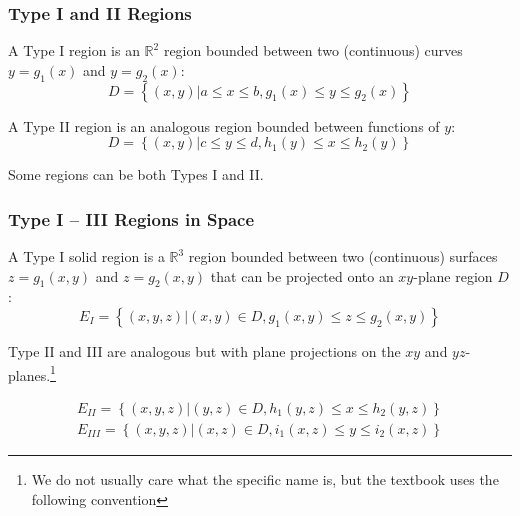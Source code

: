 \documentclass{article}
\begin{document}
\subsubsection{Type I and II Regions}
A Type I region is an $\mathbb{R}^2$ region bounded between two (continuous) curves $y=g_1(x)$ and $y=g_2(x)$:
$$D=\left\{(x,y)|a\le x\le b, g_1(x)\le y\le g_2(x)\right\}$$

A Type II region is an analogous region bounded between functions of $y$:
$$D=\left\{(x,y)|c\le y\le d, h_1(y)\le x\le h_2(y)\right\}$$

Some regions can be both Types I and II.

\subsubsection{Type I -- III Regions in Space}
A Type I solid region is a $\mathbb{R}^3$ region bounded between two (continuous) surfaces $z=g_1(x,y)$ and $z=g_2(x,y)$ that can be projected onto an $xy$-plane region $D$:
$$E_I=\left\{(x,y,z)|(x,y)\in D, g_1(x,y)\le z \le g_2(x,y)\right\}$$

Type II and III are analogous but with plane projections on the $xy$ and $yz$-planes.\footnote{We do not usually care what the specific name is, but the textbook uses the following convention}

\begin{align*}
E_{II}=\left\{(x,y,z)|(y,z)\in D, h_1(y,z)\le x \le h_2(y,z)\right\}\\
E_{III}=\left\{(x,y,z)|(x,z)\in D, i_1(x,z)\le y \le i_2(x,z)\right\}
\end{align*}
\end{document}

